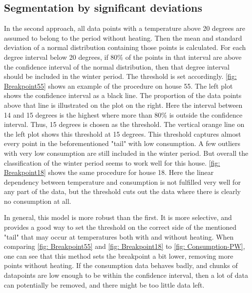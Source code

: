 \subsection{Segmentation by significant deviations}
In the second approach, all data points with a temperature
above 20 degrees are assumed to belong to the period without heating. Then the mean and standard deviation of a normal distribution containing those points is calculated.
For each degree interval below 20 degrees, if 80\% of the points in that interval are above the confidence interval of the normal distribution, then that degree interval should be included in the winter period. The threshold is set accordingly. \cref{fig: Breakpoint55} shows an example of the procedure on house 55. The left plot shows the confidence interval as a black line. The proportion of the data points above that line is illustrated on the plot on the right. Here the interval between 14 and 15 degrees is the highest where more than 80\% is outside the confidence interval. Thus, 15 degrees is chosen as the threshold. The vertical orange line on the left plot shows this threshold at 15 degrees. This threshold captures almost every point in the beforementioned "tail" with low consumption. A few outliers with very low consumption are still included in the winter period. But overall the classification of the winter period seems to work well for this house. \cref{fig: Breakpoint18} shows the same procedure for house 18. Here the linear dependency between temperature and consumption is not fulfilled very well for any part of the data, but the threshold cuts out the data where there is clearly no consumption at all.

\noindent In general, this model is more robust than the first. It is more selective, and provides a good way to set the threshold on the correct side of the mentioned "tail" that may occur at temperatures both with and without heating.
When comparing \cref{fig: Breakpoint55} and \cref{fig: Breakpoint18} to \cref{fig: Consumption-PW}, one can see that this method sets the breakpoint a bit lower, removing more points without heating. If the consumption data behaves badly, and chunks of datapoints are low enough to be within the confidence interval, then a lot of data can potentially be removed, and there might be too little data left.

